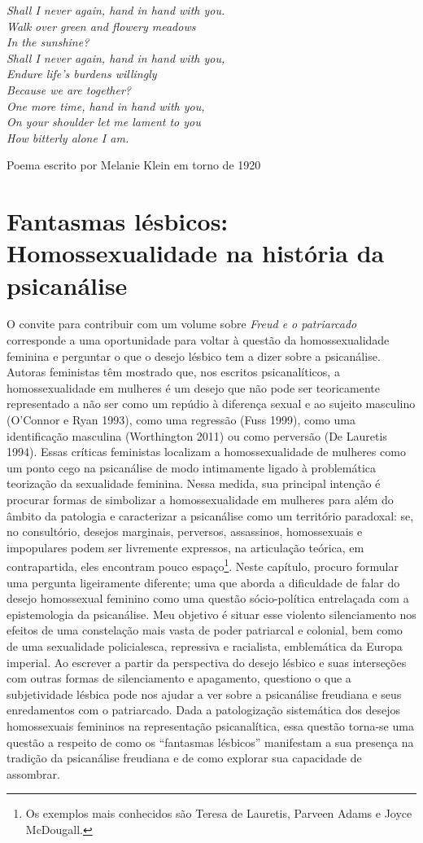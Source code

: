 \epigraph{\emph{Shall I never again, hand in hand with you.\\
Walk over green and flowery meadows\\
In the sunshine?\\
Shall I never again, hand in hand with you,\\
Endure life's burdens willingly\\
Because we are together?\\
One more time, hand in hand with you,\\
On your shoulder let me lament to you\\
How bitterly alone I am.}}{Poema escrito por Melanie Klein em torno de 1920}

\section{Fantasmas lésbicos: Homossexualidade na história da psicanálise}

O convite para contribuir com um volume sobre \emph{Freud e o
patriarcado} corresponde a uma oportunidade para voltar à questão da
homossexualidade feminina e perguntar o que o desejo lésbico tem a dizer
sobre a psicanálise. Autoras feministas têm mostrado que, nos escritos
psicanalíticos, a homossexualidade em mulheres é um desejo que não pode
ser teoricamente representado a não ser como um repúdio à diferença
sexual e ao sujeito masculino (O'Connor e Ryan 1993), como uma regressão
(Fuss 1999), como uma identificação masculina (Worthington 2011) ou como
perversão (De Lauretis 1994). Essas críticas feministas localizam a
homossexualidade de mulheres como um ponto cego na psicanálise de modo
intimamente ligado à problemática teorização da sexualidade feminina.
Nessa medida, sua principal intenção é procurar formas de simbolizar a
homossexualidade em mulheres para além do âmbito da patologia e
caracterizar a psicanálise como um território paradoxal: se, no
consultório, desejos marginais, perversos, assassinos, homossexuais e
impopulares podem ser livremente expressos, na articulação teórica, em
contrapartida, eles encontram pouco espaço\footnote{Os exemplos mais
  conhecidos são Teresa de Lauretis, Parveen Adams e Joyce McDougall.}.
Neste capítulo, procuro formular uma pergunta ligeiramente diferente;
uma que aborda a dificuldade de falar do desejo homossexual feminino
como uma questão sócio-política entrelaçada com a epistemologia da
psicanálise. Meu objetivo é situar esse violento silenciamento nos
efeitos de uma constelação mais vasta de poder patriarcal e colonial,
bem como de uma sexualidade policialesca, repressiva e racialista,
emblemática da Europa imperial. Ao escrever a partir da perspectiva do
desejo lésbico e suas interseções com outras formas de silenciamento e
apagamento, questiono o que a subjetividade lésbica pode nos ajudar a
ver sobre a psicanálise freudiana e seus enredamentos com o patriarcado.
Dada a patologização sistemática dos desejos homossexuais femininos na
representação psicanalítica, essa questão torna-se uma questão a
respeito de como os ``fantasmas lésbicos'' manifestam a sua presença na
tradição da psicanálise freudiana e de como explorar sua capacidade de
assombrar.


